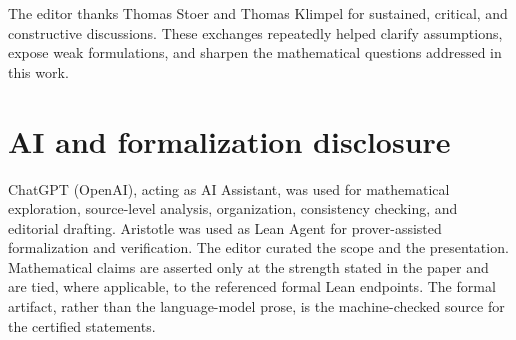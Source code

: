 \documentclass[11pt,a4paper]{article}
\theoremstyle{definition}
\theoremstyle{remark}
\begin{document}
The editor thanks Thomas Stoer and Thomas Klimpel for sustained, critical,
and constructive discussions.  These exchanges repeatedly helped clarify
assumptions, expose weak formulations, and sharpen the mathematical
questions addressed in this work.

\section*{AI and formalization disclosure}

ChatGPT (OpenAI), acting as AI Assistant, was used for mathematical
exploration, source-level analysis, organization, consistency checking, and
editorial drafting.  Aristotle was used as Lean Agent for prover-assisted
formalization and verification.  The editor curated the scope and the
presentation.  Mathematical claims are asserted only at the strength stated
in the paper and are tied, where applicable, to the referenced formal Lean
endpoints.  The formal artifact, rather than the language-model prose, is
the machine-checked source for the certified statements.
\end{document}
